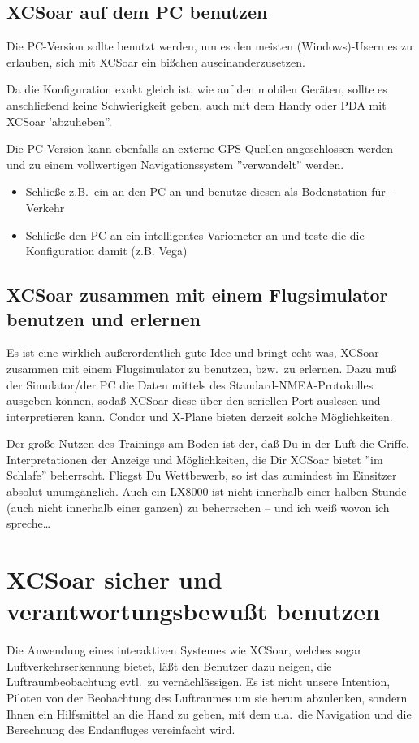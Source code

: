 \subsection*{\textsf{XCSoar} auf dem PC benutzen}
Die PC-Version sollte benutzt werden, um es den meisten (Windows)-Usern es zu erlauben, sich mit \textsf{XCSoar} ein 
bißchen auseinanderzusetzen. 

Da die Konfiguration exakt gleich ist, wie auf den mobilen Geräten, sollte es anschließend keine Schwierigkeit geben,
auch mit dem Handy oder PDA mit \textsf{XCSoar} 'abzuheben''.


Die PC-Version kann ebenfalls an externe GPS-Quellen angeschlossen werden und zu einem 
vollwertigen Navigationssystem ''verwandelt'' werden. 


\begin{itemize}
\item Schließe z.B.\ ein \fl an den PC an und benutze diesen als Bodenstation für \fl-Verkehr
\item Schließe den PC an ein intelligentes Variometer an und teste die die Konfiguration damit  (z.B. Vega)
\end{itemize}

\subsection*{\textsf{XCSoar} zusammen mit einem Flugsimulator benutzen und erlernen}
Es ist eine wirklich außerordentlich gute Idee und bringt echt was, \textsf{XCSoar} zusammen mit einem Flugsimulator zu benutzen, bzw.\ zu erlernen.
Dazu muß der Simulator/der PC die Daten mittels des Standard-NMEA-Protokolles ausgeben können, sodaß  \textsf{XCSoar} diese über den seriellen Port auslesen und interpretieren kann.
{\sc Condor} und {\sc X-Plane} bieten derzeit solche Möglichkeiten.  

Der große Nutzen des Trainings am Boden ist der, daß Du in der Luft die Griffe, Interpretationen der Anzeige und Möglichkeiten, 
die Dir \textsf{XCSoar} bietet ''im Schlafe'' beherrscht. Fliegst Du Wettbewerb, so ist das zumindest im Einsitzer absolut unumgänglich.
Auch ein LX8000 ist nicht innerhalb einer halben Stunde (auch nicht innerhalb einer ganzen) zu beherrschen -- und ich weiß wovon ich spreche\dots


\section{\textsf{XCSoar} sicher und verantwortungsbewußt benutzen}
Die Anwendung eines interaktiven Systemes wie  \textsf{XCSoar}, welches sogar Luftverkehrserkennung bietet, läßt den Benutzer dazu neigen, die Luftraumbeobachtung evtl.\ zu vernächlässigen. 
Es ist nicht unsere Intention, Piloten von der Beobachtung des Luftraumes um sie herum abzulenken,  sondern Ihnen  ein Hilfsmittel an die Hand zu geben,
mit dem u.a.\ die Navigation  und die Berechnung  des Endanfluges vereinfacht wird.

